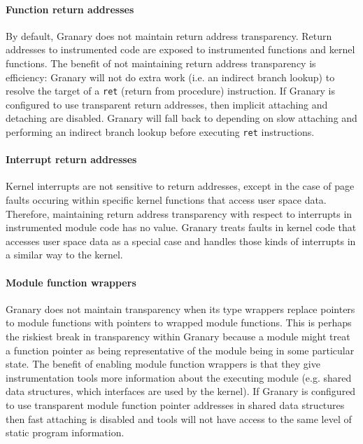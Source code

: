 \documentclass[preprint]{sigplanconf}
\begin{document}
\paragraph{Function return addresses}\label{para:return_address_transparency} By default, Granary does not maintain return address transparency. Return addresses to instrumented code are exposed to instrumented functions and kernel functions. The benefit of not maintaining return address transparency is efficiency: Granary will not do extra work (i.e. an indirect branch lookup) to resolve the target of a \texttt{ret} (return from procedure) instruction. If Granary is configured to use transparent return addresses, then implicit attaching and detaching are disabled. Granary will fall back to depending on slow attaching and performing an indirect branch lookup before executing \texttt{ret} instructions.

\paragraph{Interrupt return addresses} Kernel interrupts are not sensitive to return addresses, except in the case of page faults occuring within specific kernel functions that access user space data. Therefore, maintaining return address transparency with respect to interrupts in instrumented module code has no value. Granary treats faults in kernel code that accesses user space data as a special case and handles those kinds of interrupts in a similar way to the kernel.


\paragraph{Module function wrappers} Granary does not maintain transparency when its type wrappers replace pointers to module functions with pointers to wrapped module functions. This is perhaps the riskiest break in transparency within Granary because a module might treat a function pointer as being representative of the module being in some particular state. The benefit of enabling module function wrappers is that they give instrumentation tools more information about the executing module (e.g. shared data structures, which interfaces are used by the kernel). If Granary is configured to use transparent module function pointer addresses in shared data structures then fast attaching is disabled and tools will not have access to the same level of static program information.
\end{document}

